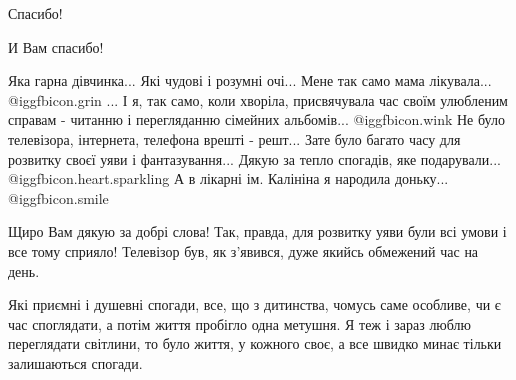 \begin{itemize}
Спасибо!

И Вам спасибо!


Яка гарна дівчинка... Які чудові і розумні очі... Мене так само мама
лікувала...  @igg{fbicon.grin} ... І я, так само, коли хворіла, присвячувала
час своїм улюбленим справам - читанню і перегляданню сімейних альбомів...
@igg{fbicon.wink}  Не було телевізора, інтернета, телефона врешті - решт...
Зате було багато часу для розвитку своєї уяви і фантазування... Дякую за тепло
спогадів, яке подарували...  @igg{fbicon.heart.sparkling}  А в лікарні ім.
Калініна я народила доньку...  @igg{fbicon.smile} 

\begin{itemize} %

Щиро Вам дякую за добрі слова! Так, правда, для розвитку уяви були всі умови і
все тому сприяло! Телевізор був, як з'явився, дуже якийсь обмежений час на
день.

\end{itemize} %


Які приємні і душевні спогади, все, що з дитинства, чомусь саме особливе, чи є час
споглядати, а потім життя пробігло одна метушня. Я теж і зараз люблю переглядати
світлини, то було життя, у кожного своє, а все швидко минає тільки залишаються
спогади.

\end{itemize} %

